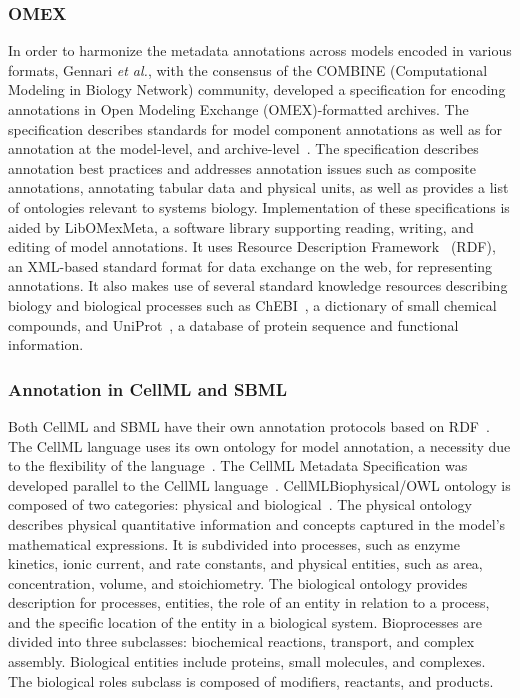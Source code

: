 \documentclass[12pt]{report}
\begin{document}
\subsubsection{OMEX}
In order to harmonize the metadata annotations across models encoded in various formats, Gennari \textit{et al.}, with the consensus of the COMBINE (Computational Modeling in Biology Network) community, developed a specification for encoding annotations in Open Modeling Exchange (OMEX)-formatted archives. The specification describes standards for model component annotations as well as for annotation at the model-level, and archive-level~\cite{Gennari2021}. The specification describes annotation best practices and addresses annotation issues such as composite annotations, annotating tabular data and physical units, as well as provides a list of ontologies relevant to systems biology. Implementation of these specifications is aided by LibOMexMeta, a software library supporting reading, writing, and editing of model annotations. It uses Resource Description Framework~\cite{Decker2000} (RDF), an XML-based standard format for data exchange on the web, for representing annotations. It also makes use of several standard knowledge resources describing biology and biological processes such as ChEBI~\cite{Hastings2015}, a dictionary of small chemical compounds, and UniProt~\cite{Apweiler2004}, a database of protein sequence and functional information.

\subsubsection{Annotation in CellML and SBML}
 Both CellML and SBML have their own annotation protocols based on RDF~\cite{Wimalaratne2009}. The CellML language uses its own ontology for model annotation, a necessity due to the flexibility of the language~\cite{Beard2009}. The CellML Metadata Specification was developed parallel to the CellML language~\cite{Wimalaratne2009}. CellMLBiophysical/OWL ontology is composed of two categories: physical and biological~\cite{Wimalaratne2009}. The physical ontology describes physical quantitative information and concepts captured in the model's mathematical expressions. It is subdivided into processes, such as enzyme kinetics, ionic current, and rate constants, and physical entities, such as area, concentration, volume, and stoichiometry. The biological ontology provides description for processes, entities, the role of an entity in relation to a process, and the specific location of the entity in a biological system. Bioprocesses are divided into three subclasses: biochemical reactions, transport, and complex assembly. Biological entities include proteins, small molecules, and complexes. The biological roles subclass is composed of modifiers, reactants, and products. 
\end{document}
